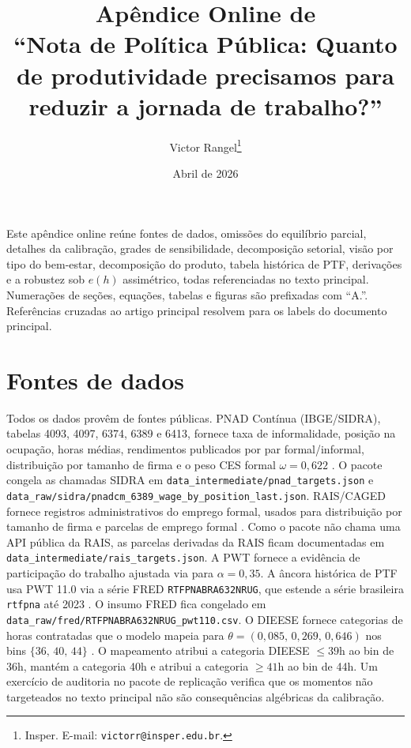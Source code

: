 \documentclass[12pt,a4paper]{article}
\title{Ap\^endice Online de\\
``Nota de Pol\'itica P\'ublica: Quanto de produtividade precisamos para reduzir a jornada de trabalho?''}
\author{Victor Rangel\thanks{Insper. E-mail: \texttt{victorr@insper.edu.br}.}}
\date{Abril de 2026}
\begin{document}
\maketitle

Este ap\^endice online re\'une fontes de dados, omiss\~oes do equil\'ibrio parcial, detalhes da calibra\c{c}\~ao, grades de sensibilidade, decomposi\c{c}\~ao setorial, vis\~ao por tipo do bem-estar, decomposi\c{c}\~ao do produto, tabela hist\'orica de PTF, deriva\c{c}\~oes e a robustez sob $e(h)$ assim\'etrico, todas referenciadas no texto principal. Numera\c{c}\~oes de se\c{c}\~oes, equa\c{c}\~oes, tabelas e figuras s\~ao prefixadas com ``A.''. Refer\^encias cruzadas ao artigo principal resolvem para os labels do documento principal.

\tableofcontents
\clearpage

\section{Fontes de dados}\label{app:data}

Todos os dados prov\^em de fontes p\'ublicas. PNAD Cont\'inua (IBGE/SIDRA), tabelas 4093, 4097, 6374, 6389 e 6413, fornece taxa de informalidade, posi\c{c}\~ao na ocupa\c{c}\~ao, horas m\'edias, rendimentos publicados por par formal/informal, distribui\c{c}\~ao por tamanho de firma e o peso CES formal $\omega=0{,}622$ \citep{PNAD2025}. O pacote congela as chamadas SIDRA em \texttt{data\_intermediate/pnad\_targets.json} e \texttt{data\_raw/sidra/pnadcm\_6389\_wage\_by\_position\_last.json}. RAIS/CAGED fornece registros administrativos do emprego formal, usados para distribui\c{c}\~ao por tamanho de firma e parcelas de emprego formal \citep{RAIS2022}. Como o pacote n\~ao chama uma API p\'ublica da RAIS, as parcelas derivadas da RAIS ficam documentadas em \texttt{data\_intermediate/rais\_targets.json}. A PWT fornece a evid\^encia de participa\c{c}\~ao do trabalho ajustada via \citet{Gollin2002} para $\alpha=0{,}35$. A \^ancora hist\'orica de PTF usa PWT 11.0 via a s\'erie FRED \texttt{RTFPNABRA632NRUG}, que estende a s\'erie brasileira \texttt{rtfpna} at\'e 2023 \citep{PWT2025,FREDPWTBrazil2026}. O insumo FRED fica congelado em \texttt{data\_raw/fred/RTFPNABRA632NRUG\_pwt110.csv}. O DIEESE fornece categorias de horas contratadas que o modelo mapeia para $\theta=(0{,}085,\,0{,}269,\,0{,}646)$ nos bins $\{36,\,40,\,44\}$ \citep{DIEESE2024}. O mapeamento atribui a categoria DIEESE $\leq 39$h ao bin de 36h, mant\'em a categoria 40h e atribui a categoria $\geq 41$h ao bin de 44h. Um exerc\'icio de auditoria no pacote de replica\c{c}\~ao verifica que os momentos n\~ao targeteados no texto principal n\~ao s\~ao consequ\^encias alg\'ebricas da calibra\c{c}\~ao.
\end{document}
